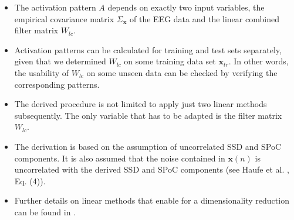 \documentclass[11pt,a4paper]{article}
\renewcommand{\vec}[1]{\mathbf{#1}}
\begin{document}
\begin{itemize}
\item The activation pattern $A$ depends on exactly two input variables, the empirical covariance matrix $\Sigma_{\vec{x}}$ of the EEG data and the linear combined filter matrix $W_{lc}$.
\item Activation patterns can be calculated for training and test sets separately, given that we determined $W_{lc}$ on some training data set $\vec{x}_{tr}$. In other words, the usability of $W_{lc}$ on some unseen data can be checked by verifying the corresponding patterns.
\item The derived procedure is not limited to apply just two linear methods subsequently. The only variable that has to be adapted is the filter matrix $W_{lc}$.
\item The derivation is based on the assumption of uncorrelated SSD and SPoC components. It is also assumed that the noise contained in $\vec{x}(n)$ is uncorrelated with the derived SSD and SPoC components (see Haufe et al. \cite{haufe:2014}, Eq. (4)).
\item Further details on linear methods that enable for a dimensionality reduction can be found in \cite{haufe:2014b}.

\end{itemize}

 

\end{document}
